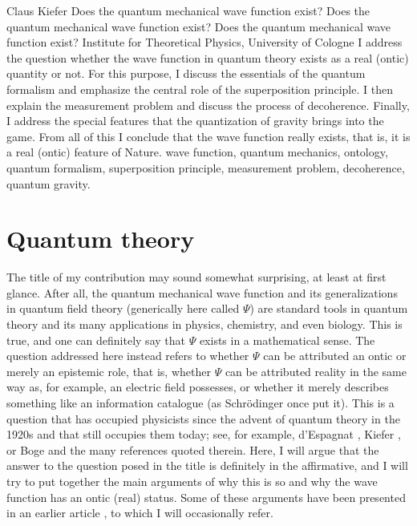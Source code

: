 \begin{artengenv}{Claus Kiefer}
	{Does the quantum mechanical wave function exist?}
	{Does the quantum mechanical wave function exist?}
	{Does the quantum mechanical wave function exist?}
	{Institute for Theoretical Physics, University of Cologne}
	{I address the question whether the wave function in quantum theory
		exists as a real (ontic) quantity or not. 
		For this purpose, I discuss the essentials of the quantum formalism and emphasize the
		central role of the superposition principle. I then explain the measurement
		problem and discuss the process of decoherence. Finally, I address the
		special features that the quantization of gravity brings into the
		game. From all of this I conclude that the wave function really
		exists, that is, it is a real (ontic) feature of Nature.}
	{wave function, quantum mechanics, ontology, quantum formalism, superposition principle, measurement problem, decoherence, quantum gravity.}







\section{Quantum theory}

\lettrine[loversize=0.13,lines=2,lraise=-0.05,nindent=0em,findent=0.2pt]%
{T}{}he title of my contribution may sound somewhat surprising, at least
at first glance. After all, the quantum mechanical wave function and
its generalizations in quantum field theory (generically here called 
$\Psi$) are standard tools in
quantum theory and its many applications in physics, chemistry, and
even biology. This is true, and one can definitely say that $\Psi$
exists in a mathematical sense. The question addressed here instead refers to
whether $\Psi$ can be attributed an ontic or merely an epistemic role,
that is, whether $\Psi$ can be attributed reality in the same way as,
for example, an electric field possesses, or whether it merely describes
something like an information catalogue (as Schr\"odinger once put
it). This is a question that has occupied physicists since the advent
of quantum theory in the 1920s and that still occupies them today;
see, for example, d'Espagnat \parencite*{despagnat_veiled_1995}, Kiefer \parencite*{kiefer_albert_2015},
or Boge \parencite*{boge_quantum_2018} and the many
references quoted therein. Here, I will argue that the answer to
the question posed in the title is definitely in the affirmative, and I
will try to put together the main arguments of why this is so and why
the wave function has an ontic (real) status. Some of these arguments
have been presented in an earlier article \parencite{kiefer_claus_emergence_2012}, to which I
will occasionally refer.  


\end{artengenv}
